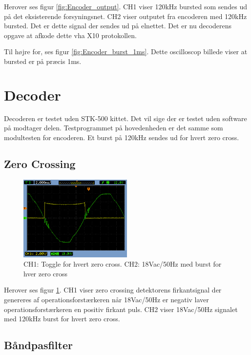 Herover ses figur \ref{fig:Encoder_output}. CH1 viser 120kHz bursted som sendes ud på det eksisterende forsyningsnet. CH2 viser outputet fra encoderen med 120kHz bursted. Det er dette signal der sendes ud på elnettet. Det er nu decoderens opgave at afkode dette vha X10 protokollen.

Til højre for, ses figur \ref{fig:Encoder_burst_1ms}. Dette oscilloscop billede viser at bursted er på præcis 1ms. 









\section{Decoder}
Decoderen er testet uden STK-500 kittet. Det vil sige der er testet uden software på modtager delen. Testprogrammet på hovedenheden er det samme som modultesten for encoderen. Et burst på 120kHz sendes ud for hvert zero cross. 

\subsection{Zero Crossing}

\begin{figure}[H]
	\centering
	\includegraphics[width=0.50\textwidth]{billeder/HWTest/Decoder/Decoder_zerocross}
	\caption{CH1: Toggle for hvert zero cross. CH2: 18Vac/50Hz med burst for hver zero cross}
	\label{fig:Decoder_ZC}
\end{figure}

Herover ses figur \ref{fig:Decoder_ZC}. CH1 viser zero crossing detektorens firkantsignal der genereres af operationsforstærkeren når 18Vac/50Hz er negativ laver operationsforstærkeren en positiv firkant puls. CH2 viser 18Vac/50Hz signalet med 120kHz burst for hvert zero cross.   

\subsection{Båndpasfilter}

